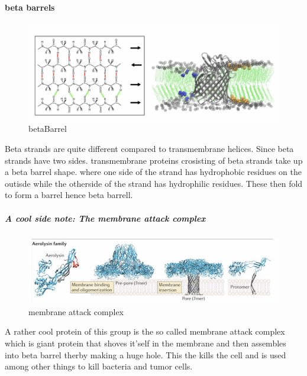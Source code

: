 \documentclass[../main.tex]{subfiles}
\begin{document}
\paragraph{beta barrels}

\begin{figure}[H]
    \centering
    \includegraphics[width=0.5\linewidth]{Sum_Cell_Bio_II//lectures//cbII2/BBarrel.png}
    \caption{\gls{betaBarrel}}
    \label{fig:enter-label}
\end{figure}
Beta strands are quite different compared to transmembrane helices. Since beta strands have two sides. transmembrane proteins crosisting of beta strands take up a beta barrel shape. where one side of the strand has hydrophobic residues on the outisde while the otherside of the strand has hydrophilic residues. These then fold to form a barrel hence beta barrell.

\subparagraph{A cool side note: The membrane attack complex}

\begin{figure}[H]
    \centering
    \includegraphics[width=0.5\linewidth]{MAC.png}
    \caption{membrane attack complex}
    \label{fig:enter-label}
\end{figure}

A rather cool protein of this group is the so called membrane attack complex which is giant protein that shoves it'self in the membrane and then assembles into beta barrel therby making a huge hole. This the kills the cell and is used among other things to kill bacteria and tumor cells.
\end{document}
